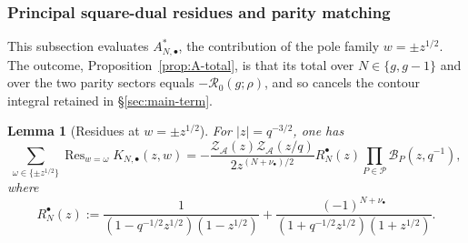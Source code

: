 \documentclass[a4paper,reqno]{amsart}
\numberwithin{equation}{section}
\newtheorem{lemma}[theorem]{Lemma}
\theoremstyle{remark}
\theoremstyle{definition}
\newcommand{\A}{\mathcal{A}}
\begin{document}
\subsubsection{Principal square-dual residues and parity matching}
\label{sec:principal-square}

This subsection evaluates $A_{N,\bullet}^{*}$, the contribution of the pole
family $w=\pm z^{1/2}$. The outcome, Proposition~\ref{prop:A-total}, is that
its total over $N\in\{g,g-1\}$ and over the two parity sectors equals
$-\mathcal R_0(g;\rho)$, and so cancels the contour integral retained in
\S\ref{sec:main-term}.

\begin{lemma}[Residues at $w=\pm z^{1/2}$]\label{lem:residue-first}
For $|z|=q^{-3/2}$, one has
\begin{equation}\label{eq:first-residue}
\sum_{\omega\in\{\pm z^{1/2}\}}
\operatorname{Res}_{w=\omega}K_{N,\bullet}(z,w)
=
-\frac{\mathcal Z_{\A}(z)\mathcal Z_{\A}(z/q)}
{2z^{(N+\nu_\bullet)/2}}
R_N^{\bullet}(z)
\prod_{P\in\mathcal P}\mathcal B_P(z,q^{-1}),
\end{equation}
where
$$
R_N^{\bullet}(z)
:=
\frac{1}
{(1-q^{-1/2}z^{1/2})(1-z^{1/2})}
+
\frac{(-1)^{N+\nu_\bullet}}
{(1+q^{-1/2}z^{1/2})(1+z^{1/2})}.
$$
\end{lemma}
\end{document}
